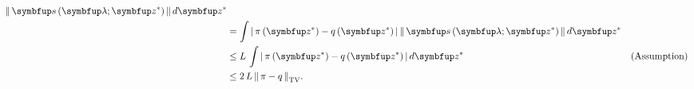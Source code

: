 \begin{proofEnd}
\begin{align}
{    } \,
    \norm{
      \vs\left(\vlambda;\vz^*\right)
    } \,
    d\vz^*
    \\
    &=
    \int
    \abs{
      \pi\left(\vz^*\right) - q\left(\vz^*\right)
    } \,
    \norm{
      \vs\left(\vlambda;\vz^*\right)
    } \,
    d\vz^*
    \\
    &\leq
    L \,
    \int
    \abs{
      \pi\left(\vz^*\right) - q\left(\vz^*\right)
    } \,
    d\vz^*
    &\text{(Assumption)}
    \\
    &\leq
    2 \, L \, \DTV{\pi}{q}.\label{eq:imh_bias_left}
  \end{align}


\end{proofEnd}
